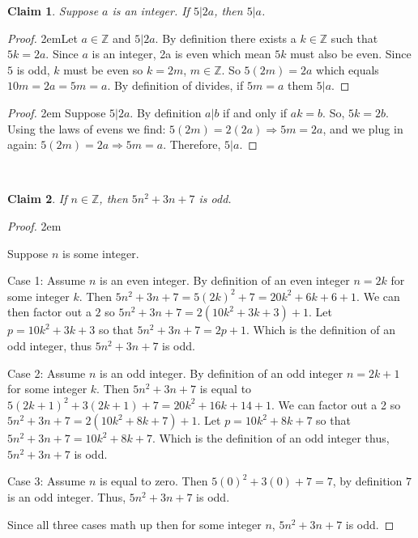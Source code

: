 \documentclass[12 pt]{article}
\newcommand{\Z}{\mathbb{Z}}
\theoremstyle{definition}
\theoremstyle{plain}
\theoremstyle{mytheorem}
\newtheorem{claim}{Claim}
\theoremstyle{myexample}
\theoremstyle{mydefinition}
\begin{document}
\newpage

\begin{claim}  Suppose $a$ is an integer.  If $5 | 2a$, then $5|a$.
\end{claim}
\vspace{-.3in}
\begin{proof}  \openup 2em{Let $a \in \Z$ and $5 |2a$.  By definition there exists a $k \in \Z$ such that $5k=2a$.  Since $a$ is an integer, 2a is even which mean $5k$ must also be even.  Since $5$ is odd, $k$ must be even so $k=2m$, $m \in \Z$.  So $5(2m)=2a$ which equals $10m=2a=5m=a$.  By definition of divides, if $5m=a$ them $5 |a$.}
\end{proof}
\begin{center} \underline{\hspace{\textwidth}} \end{center}
\begin{proof}
\openup 2em {Suppose $5|2a$.  By definition $a|b$ if and only if $ak=b$.  So, $5k=2b$.  Using the laws of evens we find: $5(2m)=2(2a) \Rightarrow 5m=2a$, and we plug in again: $5(2m)=2a \Rightarrow 5m=a.$  Therefore, $5|a$.}
\end{proof}

\begin{center} \underline{\hspace{\textwidth}}\\ \underline{\hspace{\textwidth}} \end{center}

\begin{claim}
If $n \in \Z$, then $5n^2+3n+7$ is odd.
\end{claim}

\begin{proof} \openup 2em{Suppose $n$ is some integer.
\begin{description}
\item {Case 1:} Assume $n$ is an even integer.  By definition of an even integer $n=2k$ for some integer $k$.  Then $5n^2+3n+7=5(2k)^2+7=20k^2+6k+6+1.$  We can then factor out a $2$ so $5n^2+3n+7=2(10k^2+3k+3)+1$.  Let $p = 10k^2+3k+3$ so that $5n^2+3n+7=2p+1$.  Which is the definition of an odd integer, thus $5n^2+3n+7$ is odd.
\item{Case 2:} Assume $n$ is an odd integer.  By definition of an odd integer $n=2k+1$ for some integer $k$.  Then $5n^2+3n+7$ is equal to $5(2k+1)^2+3(2k+1)+7=20k^2+16k+14+1$.  We can factor out a 2 so $5n^2+3n+7=2(10k^2+8k+7)+1$.  Let $p=10k^2+8k+7$ so that $5n^2+3n+7=10k^2+8k+7$.  Which is the definition of an odd integer thus, $5n^2+3n+7$ is odd.
\item{Case 3:} Assume $n$ is equal to zero.  Then $5(0)^2+3(0)+7=7$, by definition $7$ is an odd integer.  Thus, $5n^2+3n+7$ is odd.  
\end{description}
Since all three cases math up then for some integer $n$, $5n^2+3n+7$ is odd.}
\end{proof}
\end{document}

